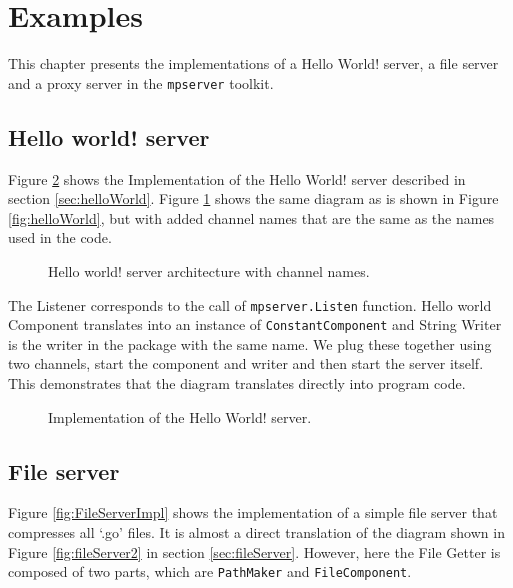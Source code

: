 \section{Examples}
\label{sec:examples}
This chapter presents the implementations of a Hello World! server,
a file server and a proxy server in the \texttt{mpserver} toolkit.

\subsection{Hello world! server}
Figure \ref{fig:HelloWorldImpl} shows the Implementation of the Hello World!
server described in section \ref{sec:helloWorld}. Figure \ref{fig:helloWorld2}
shows the same diagram as is shown in Figure \ref{fig:helloWorld}, but with
added channel names that are the same as the names used in the code.

\begin{figure}[h]
\centering
{}
\caption[scale=1.0]{Hello world! server architecture with channel names.}
\label{fig:helloWorld2}
\end{figure}

The Listener corresponds to the call of \texttt{mpserver.Listen} function.
Hello world Component translates into an instance of \texttt{ConstantComponent}
and String Writer is the writer in the package with the same name.
We plug these together using two channels, start the component and writer 
and then start the server itself. This demonstrates that the diagram translates
directly into program code.

\begin{figure}[h]
\centering

\caption[scale=1.0]{Implementation of the Hello World! server.}
\label{fig:HelloWorldImpl}
\end{figure}

\newpage
\subsection{File server}
Figure \ref{fig:FileServerImpl} shows the implementation of a simple 
file server that compresses all `.go' files. It is almost a direct translation
of the diagram shown in Figure \ref{fig:fileServer2} in section \ref{sec:fileServer}.
However, here the File Getter is composed of two parts, which are \texttt{PathMaker}
and \texttt{FileComponent}.

